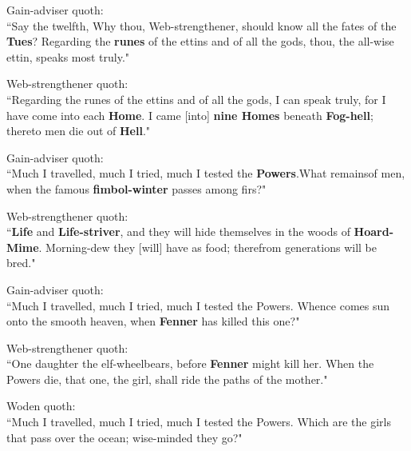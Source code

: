 \bv Gain-adviser quoth: \\ “Say the twelfth, Why thou, Web-strengthener, should know all the fates of the \textbf{Tues}\footnotemark[73]? Regarding the \textbf{runes} of the ettins and of all the gods, thou, the all-wise ettin, speaks most truly." \\

\bv Web-strengthener quoth: \\ “Regarding the runes of the ettins and of all the gods, I can speak truly, for I have come into each \textbf{Home}. I came [into] \textbf{nine Homes} beneath \textbf{Fog-hell}; thereto men die out of \textbf{Hell}\footnotemark[75]." \\

\bv Gain-adviser quoth: \\ “Much I travelled, much I tried, much I tested the \textbf{Powers}.\footnotemark[80] What remains\footnotemark[79] of men, when the famous \textbf{fimbol-winter} passes among firs\footnotemark[81]?" \\

\bv Web-strengthener quoth: \\ “\textbf{Life} and \textbf{Life-striver}, and they will hide themselves in the woods of \textbf{Hoard-Mime}\footnotemark[85]. Morning-dew they [will] have as food; therefrom generations will be bred." \\

\bv Gain-adviser quoth: \\ “Much I travelled, much I tried, much I tested the Powers. Whence comes sun onto the smooth heaven, when \textbf{Fenner} has killed this one\footnotemark[90]?" \\

\bv Web-strengthener quoth: \\ “One daughter the elf-wheel\footnotemark[95] bears, before \textbf{Fenner} might kill her. When the Powers die, that one, the girl, shall ride the paths of the mother." \\

\bv Woden quoth: \\ “Much I travelled, much I tried, much I tested the Powers. Which are the girls that pass over the ocean; wise-minded they go?" \\
